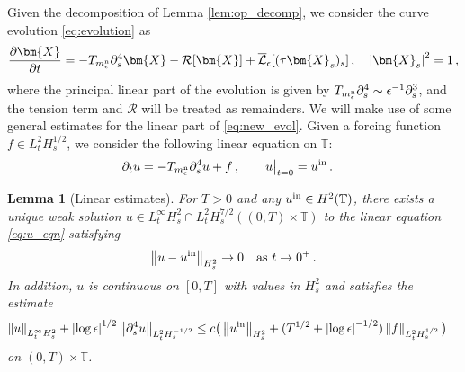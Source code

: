 \documentclass[11pt,reqno]{amsart}
\newcommand{\T}{\mathbb{T}}
\newcommand{\X}{\bm{X}}
\newcommand{\p}{\partial}
\newcommand{\abs}[1]{\left\lvert #1 \right\rvert}
\newcommand{\norm}[1]{\left\lVert #1 \right\rVert}
\newcommand{\mc}[1]{\mathcal{#1}}
\numberwithin{equation}{section}
\newtheorem{lemma}[theorem]{Lemma}
\theoremstyle{definition}
\begin{document}
Given the decomposition of Lemma \ref{lem:op_decomp}, we consider the curve evolution \eqref{eq:evolution} as
\begin{equation}\label{eq:new_evol}
  \frac{\p\X}{\p t} = -T_{m_\epsilon^{\rm n}}\p_s^4\X - \mc{R}[\X] + \overline{\mc{L}}_\epsilon[(\tau\X_s)_s]\,, \quad \abs{\X_s}^2=1\,,
\end{equation}
where the principal linear part of the evolution is given by $T_{m_\epsilon^{\rm n}}\p_s^4\sim \epsilon^{-1}\p_s^3$, and the tension term and $\mc{R}$ will be treated as remainders. We will make use of some general estimates for the linear part of \eqref{eq:new_evol}. 
Given a forcing function $f\in L^2_tH^{1/2}_s$, we consider the following linear equation on $\T$:
\begin{equation}\label{eq:u_eqn}
\begin{aligned}
  \p_t u &= -T_{m_\epsilon^{\rm n}}\p_s^4u + f \,, 
  \qquad u\big|_{t=0} = u^{\rm in}\,.
\end{aligned}
\end{equation}
%
%
\begin{lemma}[Linear estimates]\label{lem:linear}
For $T>0$ and any $u^{\rm in}\in H^2(\T)$, there exists a unique weak solution $u\in L^\infty_tH^2_s\cap L^2_tH^{7/2}_s((0,T)\times\T)$ to the linear equation \eqref{eq:u_eqn} satisfying 
\begin{equation}
  \norm{u-u^{\rm in}}_{H^2_s}\to 0 \quad \text{as }t\to 0^+\,.
\end{equation}
In addition, $u$ is continuous on $[0,T]$ with values in $H^2_s$ and satisfies the estimate 
\begin{equation}\label{eq:ubd}
\begin{aligned}
   \norm{u}_{L^\infty_tH^2_s}+ \abs{\log\epsilon}^{1/2}\norm{\p_s^4u}_{L^2_tH^{-1/2}_s}
   &\le c\big(\norm{u^{\rm in}}_{H^2_s} + (T^{1/2}+\abs{\log\epsilon}^{-1/2})\norm{f}_{L^2_tH^{1/2}_s} \big) 
\end{aligned}
\end{equation}
on $(0,T)\times\T$.
\end{lemma}
\end{document}
